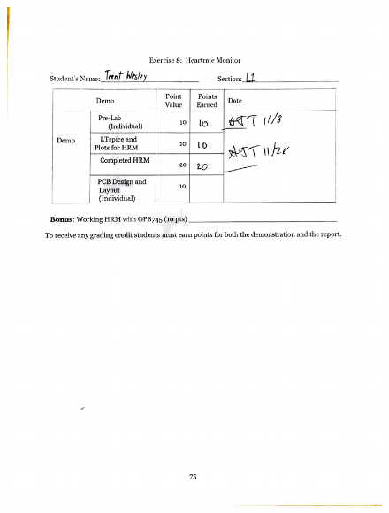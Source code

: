 \documentclass[CMPE]{KGCOEReport}
\begin{document}
\newpage
\begin{figure}[H]
    \centering
    \begin{adjustbox}{center}
        \includegraphics[width=1.26\textwidth]{signoff_1.pdf}
    \end{adjustbox}
\end{figure}
\end{document}
